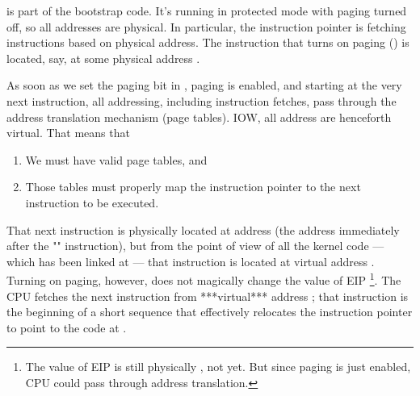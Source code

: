 \begin{itemize}
\begin{itemize}
\begin{description}
       is part of the bootstrap code. It's running in protected mode with
      paging turned off, so all addresses are physical. In particular, the instruction
      pointer is fetching instructions based on physical address. The instruction that
      turns on paging () is located, say, at some physical address
      .

      As soon as we set the paging bit in , paging is enabled, and starting at
      the very next instruction, all addressing, including instruction fetches, pass
      through the address translation mechanism (page tables). IOW, all address are
      henceforth virtual. That means that
      \begin{enumerate}
      \item We must have valid page tables, and
      \item Those tables must properly map the instruction pointer to the next instruction
        to be executed.
      \end{enumerate}
      That next instruction is physically located at address  (the address
      immediately after the "" instruction), but from the point of
      view of all the kernel code --- which has been linked at  ---
      that instruction is located at virtual address . Turning on
      paging, however, does not magically change the value of EIP \footnote{The value of
        EIP is still physically , not  yet. But since
        paging is just enabled, CPU could pass  through address translation.}.
      The CPU fetches the next instruction from ***virtual*** address ; that
      instruction is the beginning of a short sequence that effectively relocates the
      instruction pointer to point to the code at .


\end{description}
\end{itemize}
\end{itemize}

